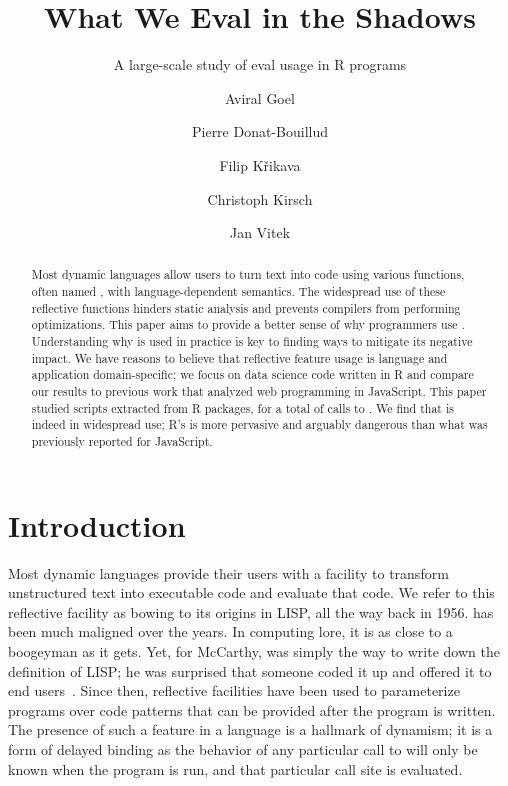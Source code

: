 \documentclass[review,screen,acmsmall]{acmart}
\begin{document}
\title{What We Eval in the Shadows}
\subtitle{A large-scale study of {\sf eval} usage in R programs}

\author{Aviral Goel}
\author{Pierre Donat-Bouillud}
\author{Filip Křikava}
\author{Christoph Kirsch}
\author{Jan Vitek}

\begin{abstract}
  \noindent Most dynamic languages allow users to turn text into code using
  various functions, often named \eval, with language-dependent semantics. The
  widespread use of these reflective functions hinders static analysis and
  prevents compilers from performing optimizations. This paper aims to provide a
  better sense of why programmers use \eval. Understanding why \eval is used in
  practice is key to finding ways to mitigate its negative impact. We have
  reasons to believe that reflective feature usage is language and application
  domain-specific; we focus on data science code written in R and compare our
  results to previous work that analyzed web programming in JavaScript. This
  paper studied \CranRunnableScripts scripts extracted from \CranPackages R
  packages, for a total of \packageAllcalls calls to \eval. We find that \eval
  is indeed in widespread use; R's \eval is more pervasive and arguably
  dangerous than what was previously reported for JavaScript.
\end{abstract}

\maketitle
\renewcommand{\shortauthors}{A. Goel, P. Donat-Bouillud, F. Křikava, C. Kirsch and J. Vitek}

\section{Introduction}

Most dynamic languages provide their users with a facility to
transform unstructured text into executable code and evaluate that
code. We refer to this reflective facility as \eval bowing to its
origins in LISP, all the way back in 1956. \Eval has been
much maligned over the years. In computing lore, it is as close to a
boogeyman as it gets. Yet, for McCarthy, \eval was simply the way to
write down the definition of LISP; he was surprised that someone coded
it up and offered it to end users~\cite{lisp}. Since then, reflective facilities
have been used to parameterize programs over code patterns that can be
provided after the program is written. The presence of such a feature
in a language is a hallmark of dynamism; it is a form of delayed
binding as the behavior of any particular call to \eval will only be
known when the program is run, and that particular call site is
evaluated.
\end{document}
